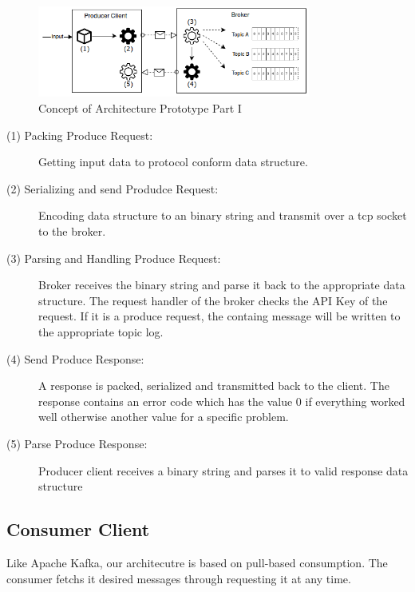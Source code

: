 \begin{figure}[H]
    \centering
    \includegraphics[width=0.8\textwidth]{images/concept_producer.png}
    \caption{Concept of Architecture Prototype Part I}
    \label{fig:conept-producer}
\end{figure}

\begin{description}
    \item [(1) Packing Produce Request:] 
    {Getting input data to protocol conform data structure.}
    \item [(2) Serializing and send Produdce Request:]  
        {Encoding data structure to an binary  string and transmit over a tcp
        socket to the broker.}
    \item [(3) Parsing and Handling Produce Request:] 
        {Broker receives the binary string and parse it back to the appropriate
        data structure. The request handler of the  broker checks the
        API Key of the request. If it is a produce request, the containg
        message will be written to the appropriate topic log.}
    \item [(4) Send Produce Response:]  
        {A response is packed, serialized and transmitted back to the client.
            The response contains an error code which has the value 0 if everything worked well
        otherwise another value for a specific problem. }
    \item [(5) Parse Produce Response:] 
        {Producer client receives a binary string and parses it to valid response data
        structure }
\end{description}

\subsection{Consumer Client}
Like Apache Kafka, our architecutre is based on pull-based consumption. The consumer
fetchs it desired messages through requesting it at any time. 

